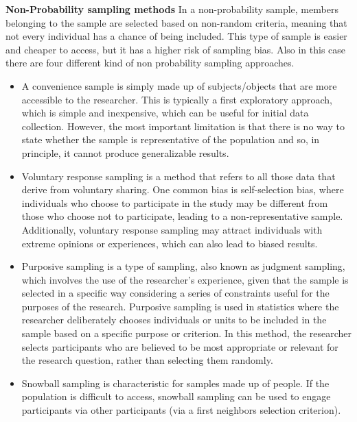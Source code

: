 \documentclass[
  letterpaper,
  DIV=11,
  numbers=noendperiod]{scrreprt}
\begin{document}
\textbf{Non-Probability sampling methods} In a non-probability sample,
members belonging to the sample are selected based on non-random
criteria, meaning that not every individual has a chance of being
included. This type of sample is easier and cheaper to access, but it
has a higher risk of sampling bias. Also in this case there are four
different kind of non probability sampling approaches.

\begin{itemize}
\item
  A convenience sample is simply made up of subjects/objects that are
  more accessible to the researcher. This is typically a first
  exploratory approach, which is simple and inexpensive, which can be
  useful for initial data collection. However, the most important
  limitation is that there is no way to state whether the sample is
  representative of the population and so, in principle, it cannot
  produce generalizable results.
\item
  Voluntary response sampling is a method that refers to all those data
  that derive from voluntary sharing. One common bias is self-selection
  bias, where individuals who choose to participate in the study may be
  different from those who choose not to participate, leading to a
  non-representative sample. Additionally, voluntary response sampling
  may attract individuals with extreme opinions or experiences, which
  can also lead to biased results.
\item
  Purposive sampling is a type of sampling, also known as judgment
  sampling, which involves the use of the researcher's experience, given
  that the sample is selected in a specific way considering a series of
  constraints useful for the purposes of the research. Purposive
  sampling is used in statistics where the researcher deliberately
  chooses individuals or units to be included in the sample based on a
  specific purpose or criterion. In this method, the researcher selects
  participants who are believed to be most appropriate or relevant for
  the research question, rather than selecting them randomly.
\item
  Snowball sampling is characteristic for samples made up of people. If
  the population is difficult to access, snowball sampling can be used
  to engage participants via other participants (via a first neighbors
  selection criterion).
\end{itemize}
\end{document}
